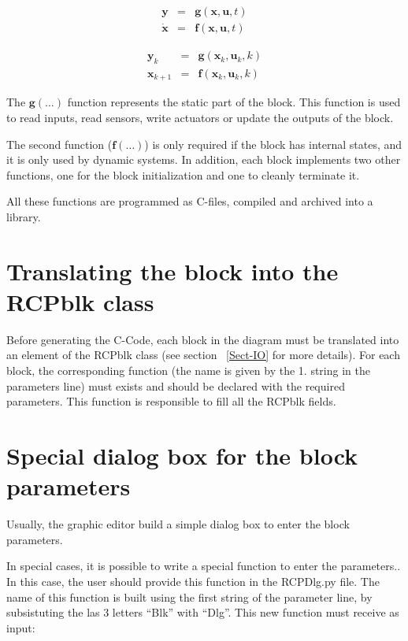 \begin{equation}
\label{eq:syscont}
\begin{array}{lll}
\mathbf{y} & = & \mathbf{g}(\mathbf{x},\mathbf{u},t) \\
\dot{\mathbf{x}} & = & \mathbf{f}(\mathbf{x},\mathbf{u},t) 
\end{array}
\end{equation}

\begin{equation}
\label{eq:sysdisc}
\begin{array}{lll}
\mathbf{y}_k & = & \mathbf{g}(\mathbf{x}_k,\mathbf{u}_k,k) \\
\mathbf{x}_{k+1} & = & \mathbf{f}(\mathbf{x}_k,\mathbf{u}_k,k) 
\end{array}
\end{equation}

The $\mathbf{g}(\ldots)$ function represents the static part of the block. 
This function is used to read inputs, read sensors, write actuators or 
update the outputs of the block.

The second function ($\mathbf{f}(\ldots)$) is only required if the block has 
internal states, and it is only used by dynamic systems. In 
addition, each block implements two other functions, one for the block 
initialization and one to cleanly terminate it.

All these functions are programmed as C-files, compiled and archived into a 
library.

\section{Translating the block into the RCPblk class}
Before generating the C-Code, each block in the diagram must be translated into 
an element of the RCPblk class (see section ~\ref{Sect-IO} for more details).
For each block, the corresponding function (the name is given by the 1. string 
in the parameters line) 
must exists and should be declared with the required parameters. This function 
is responsible to fill all the RCPblk fields.

\section{Special dialog box for the block parameters}
Usually, the graphic editor build a simple dialog box to enter the block 
parameters. 

In special cases, it is possible to write a special function to 
enter the parameters.. In this case, the user should provide this function in 
the RCPDlg.py file.
The name of this function is built using the first string of the parameter 
line, by subsistuting the las 3 letters ``Blk'' with ``Dlg''. This new function 
must receive as input:

